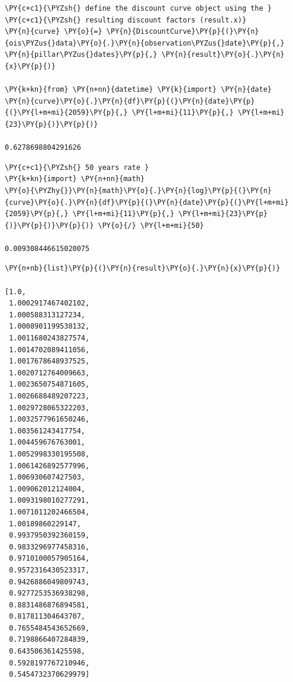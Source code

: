 \begin{Verbatim}[commandchars=\\\{\}]
\PY{c+c1}{\PYZsh{} define the discount curve object using the }
\PY{c+c1}{\PYZsh{} resulting discount factors (result.x)}
\PY{n}{curve} \PY{o}{=} \PY{n}{DiscountCurve}\PY{p}{(}\PY{n}{ois\PYZus{}data}\PY{o}{.}\PY{n}{observation\PYZus{}date}\PY{p}{,} \PY{n}{pillar\PYZus{}dates}\PY{p}{,} \PY{n}{result}\PY{o}{.}\PY{n}{x}\PY{p}{)}

\PY{k+kn}{from} \PY{n+nn}{datetime} \PY{k}{import} \PY{n}{date}
\PY{n}{curve}\PY{o}{.}\PY{n}{df}\PY{p}{(}\PY{n}{date}\PY{p}{(}\PY{l+m+mi}{2059}\PY{p}{,} \PY{l+m+mi}{11}\PY{p}{,} \PY{l+m+mi}{23}\PY{p}{)}\PY{p}{)}

0.6278698804291626
\end{Verbatim}
            
\begin{Verbatim}[commandchars=\\\{\}]
\PY{c+c1}{\PYZsh{} 50 years rate }
\PY{k+kn}{import} \PY{n+nn}{math}
\PY{o}{\PYZhy{}}\PY{n}{math}\PY{o}{.}\PY{n}{log}\PY{p}{(}\PY{n}{curve}\PY{o}{.}\PY{n}{df}\PY{p}{(}\PY{n}{date}\PY{p}{(}\PY{l+m+mi}{2059}\PY{p}{,} \PY{l+m+mi}{11}\PY{p}{,} \PY{l+m+mi}{23}\PY{p}{)}\PY{p}{)}\PY{p}{)} \PY{o}{/} \PY{l+m+mi}{50}

0.009308446615020075
\end{Verbatim}
            
\begin{Verbatim}[commandchars=\\\{\}]
\PY{n+nb}{list}\PY{p}{(}\PY{n}{result}\PY{o}{.}\PY{n}{x}\PY{p}{)}

[1.0,
 1.0002917467402102,
 1.000588313127234,
 1.0008901199538132,
 1.0011680243827574,
 1.0014702089411056,
 1.0017678648937525,
 1.0020712764009663,
 1.0023650754871605,
 1.0026688489207223,
 1.0029728065322203,
 1.0032577961650246,
 1.003561243417754,
 1.004459676763001,
 1.0052998330195508,
 1.0061426892577996,
 1.006930607427503,
 1.009062012124004,
 1.0093198010277291,
 1.0071011202466504,
 1.00189860229147,
 0.9937950392360159,
 0.9833296977458316,
 0.9710100057905164,
 0.9572316430523317,
 0.9426886049809743,
 0.9277253536938298,
 0.8831486876894581,
 0.817811304643707,
 0.7655484543652669,
 0.7198866407284839,
 0.643506361425598,
 0.5928197767210946,
 0.5454732370629979]
\end{Verbatim}

